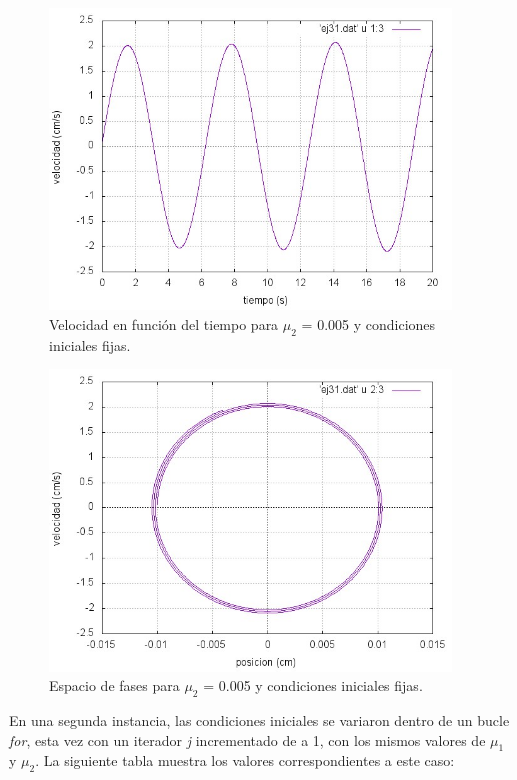 \documentclass[a4paper,12pt]{article}
\begin{document}
\begin{itemize}
\begin{figure}[H]
\begin{center}
\includegraphics[height=8cm]{grafico_ej31_vVSt.jpg}
\caption[width=5cm]{Velocidad en funci\'on del tiempo para $\mu_2$ = 0.005 y condiciones iniciales fijas.}
\end{center}
\end{figure}

\begin{figure}[H]
\begin{center}
\includegraphics[height=8cm]{grafico_ej31_xVSv.jpg}
\caption[width=5cm]{Espacio de fases para $\mu_2$ = 0.005 y condiciones iniciales fijas.}
\end{center}
\end{figure}


En una segunda instancia, las condiciones iniciales se variaron dentro de un bucle \textit{for}, esta vez con un iterador \textit{j} incrementado de a 1, con los mismos valores de $\mu_1$ y $\mu_2$. La siguiente tabla muestra los valores correspondientes a este caso:


\end{itemize}
\end{document}
